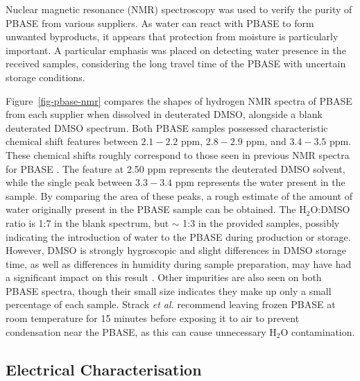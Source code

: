 \documentclass[
  a4paper,
]{scrbook}
\begin{document}
Nuclear magnetic resonance (NMR) spectroscopy was used to verify the
purity of PBASE from various suppliers. As water can react with PBASE to
form unwanted byproducts, it appears that protection from moisture is
particularly important. A particular emphasis was placed on detecting
water presence in the received samples, considering the long travel time
of the PBASE with uncertain storage conditions.

Figure~\ref{fig-pbase-nmr} compares the shapes of hydrogen NMR spectra
of PBASE from each supplier when dissolved in deuterated DMSO, alongside
a blank deuterated DMSO spectrum. Both PBASE samples possessed
characteristic chemical shift features between \(2.1-2.2\) ppm,
\(2.8-2.9\) ppm, and \(3.4-3.5\) ppm. These chemical shifts roughly
correspond to those seen in previous NMR spectra for PBASE
\autocite{NMR2}. The feature at 2.50 ppm represents the deuterated DMSO
solvent, while the single peak between \(3.3-3.4\) ppm represents the
water present in the sample. By comparing the area of these peaks, a
rough estimate of the amount of water originally present in the PBASE
sample can be obtained. The H\(_{2}\)O:DMSO ratio is 1:7 in the blank
spectrum, but \(\sim\) 1:3 in the provided samples, possibly indicating
the introduction of water to the PBASE during production or storage.
However, DMSO is strongly hygroscopic and slight differences in DMSO
storage time, as well as differences in humidity during sample
preparation, may have had a significant impact on this result
\autocite{Lebel1962}. Other impurities are also seen on both PBASE
spectra, though their small size indicates they make up only a small
percentage of each sample. Strack \emph{et al.} \autocite{Strack2013}
recommend leaving frozen PBASE at room temperature for 15 minutes before
exposing it to air to prevent condensation near the PBASE, as this can
cause unnecessary H\(_2\)O contamination.

\hypertarget{sec-PBASE-electrical-characterisation}{%
\subsection{Electrical
Characterisation}\label{sec-PBASE-electrical-characterisation}}
\end{document}
